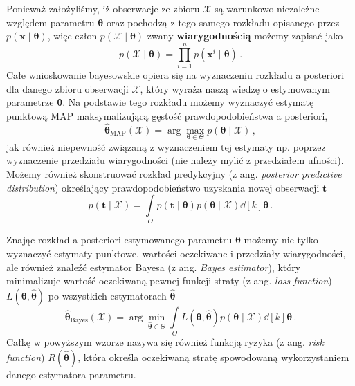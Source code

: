 \documentclass{myclass}
\numberwithin{equation}{subsection}
\begin{document}
Ponieważ założyliśmy, iż obserwacje ze zbioru \(\mathcal{X}\) są warunkowo niezależne względem
parametru \(\boldsymbol{\theta}\) oraz pochodzą z tego samego rozkładu opisanego przez
\(p(\mathbf{x} \mid \boldsymbol{\theta})\), więc człon \(p(\mathcal{X} \mid \boldsymbol{\theta})\)
zwany \textbf{wiarygodnością} możemy zapisać jako
\begin{equation}
    p(\mathcal{X} \mid \boldsymbol{\theta}) = \prod_{i=1}^n p(\mathbf{x}^i \mid \boldsymbol{\theta})\,.    
\end{equation}
Całe wnioskowanie bayesowskie opiera się na wyznaczeniu rozkładu a posteriori dla danego zbioru
obserwacji \(\mathcal{X}\), który wyraża naszą wiedzę o estymowanym parametrze
\(\boldsymbol{\theta}\). Na podstawie tego rozkładu możemy wyznaczyć estymatę punktową MAP
maksymalizującą gęstość prawdopodobieństwa a posteriori, 
\begin{equation}
    \boldsymbol{\hat \theta}_\mathrm{MAP}(\mathcal{X}) = \arg \max_{\boldsymbol{\theta} \in \Theta} p(\boldsymbol{\theta} \mid \mathcal{X})\,,
\end{equation}
jak również niepewność związaną z wyznaczeniem tej estymaty np. poprzez wyznaczenie przedziału
wiarygodności (nie należy mylić z przedziałem ufności). Możemy również skonstruować rozkład
predykcyjny (z ang. \textit{posterior predictive distribution}) określający prawdopodobieństwo
uzyskania nowej obserwacji \(\mathbf{t}\)\
\begin{equation}
    p(\mathbf{t} \mid \mathcal{X}) = \int\limits_\Theta p(\mathbf{t} \mid \boldsymbol{\theta}) p(\boldsymbol{\theta} \mid \mathcal{X}) \dd[k]{\boldsymbol{\theta}}\,.
\end{equation}

Znając rozkład a posteriori estymowanego parametru \(\boldsymbol{\theta}\) możemy nie tylko
wyznaczyć estymaty punktowe, wartości oczekiwane i przedziały wiarygodności, ale również znaleźć
estymator Bayesa (z ang. \textit{Bayes estimator}), który minimalizuje wartość oczekiwaną pewnej
funkcji straty (z ang. \textit{loss function}) \(L(\boldsymbol{\theta}, \boldsymbol{\hat \theta})\)
po wszystkich estymatorach \(\boldsymbol{\hat \theta}\)
\begin{equation}
    \boldsymbol{\hat \theta}_\mathrm{Bayes}(\mathcal{X}) = \arg\min_{\boldsymbol{\hat \theta} \in \Theta} \int\limits_{\Theta} L(\boldsymbol{\theta}, \boldsymbol{\hat \theta}) p(\boldsymbol{\theta} \mid \mathcal{X}) \dd[k]{\boldsymbol{\theta}}\,.
\end{equation}
Całkę w powyższym wzorze nazywa się również funkcją ryzyka (z ang. \textit{risk function})
\(R(\boldsymbol{\hat \theta})\), która określa oczekiwaną stratę spowodowaną wykorzystaniem danego
estymatora parametru.
\end{document}
